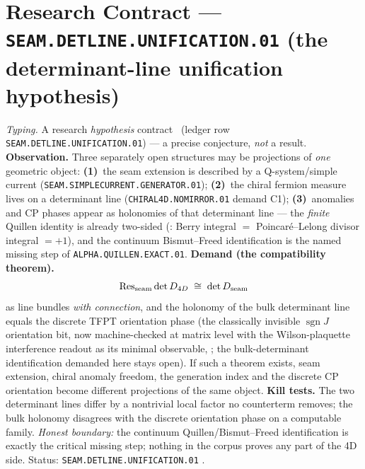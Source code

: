 \documentclass[11pt,a4paper]{article}
\begin{document}
\section*{Research Contract --- \texttt{SEAM.DETLINE.UNIFICATION.01} (the determinant-line unification hypothesis)}
\noindent\emph{Typing.} A research \emph{hypothesis} contract \mO\ (ledger row
\texttt{SEAM.DETLINE.UNIFICATION.01}) --- a precise conjecture, \emph{not} a result.
\textbf{Observation.}  Three separately open structures may be projections of \emph{one}
geometric object: \textbf{(1)}~the seam extension is described by a Q-system/simple current
(\texttt{SEAM.SIMPLECURRENT.GENERATOR.01}); \textbf{(2)}~the chiral fermion measure lives on a
determinant line (\texttt{CHIRAL4D.NOMIRROR.01} demand C1); \textbf{(3)}~anomalies and CP
phases appear as holonomies of that determinant line --- the \emph{finite} Quillen identity is
already two-sided (: Berry integral $=$
Poincar\'e--Lelong divisor integral $=+1$), and the continuum Bismut--Freed identification is
the named missing step of \texttt{ALPHA.QUILLEN.EXACT.01}.  \textbf{Demand (the compatibility
theorem).}
\[
\operatorname{Res}_{\rm seam}\det D_{4D}\;\cong\;\det D_{\rm seam}
\]
as line bundles \emph{with connection}, and the holonomy of the bulk determinant line equals
the discrete TFPT orientation phase (the classically invisible $\operatorname{sgn}J$
orientation bit, now machine-checked at matrix level with the Wilson-plaquette interference
readout as its minimal observable, ; the
bulk-determinant identification demanded here stays open).  If such a theorem exists, seam extension, chiral
anomaly freedom, the generation index and the discrete CP orientation become different
projections of the same object.  \textbf{Kill tests.}  The two determinant lines differ by a
nontrivial local factor no counterterm removes; the bulk holonomy disagrees with the discrete
orientation phase on a computable family.  \emph{Honest boundary:} the continuum
Quillen/Bismut--Freed identification is exactly the critical missing step; nothing in the
corpus proves any part of the 4D side.  Status: \texttt{SEAM.DETLINE.UNIFICATION.01} \mO.

\end{document}
